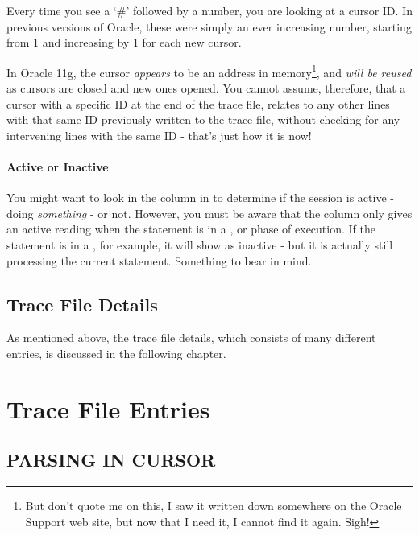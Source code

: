 Every time you see a `\#' followed by a number, you are looking at a cursor ID. In previous versions of Oracle, these were simply an ever increasing number, starting from 1 and increasing by 1 for each new cursor.

In Oracle 11g, the cursor \emph{appears} to be an address in memory\footnote{But don't quote me on this, I saw it written down somewhere on the Oracle Support web site, but now that I need it, I cannot find it again. Sigh!}, and \emph{will be reused} as cursors are closed and new ones opened. You cannot assume, therefore, that a cursor with a specific ID at the end of the trace file, relates to any other lines with that same ID previously written to the trace file, without checking for any intervening  lines with the same ID - that's just how it is now!

\subsubsection{Active or Inactive}\label{active-or-inactive}

You might want to look in the  column in  to determine if the session is active - doing \emph{something} - or not. However, you must be aware that the  column only gives an active reading when the statement is in a ,  or  phase of execution. If the statement is in a , for example, it will show as inactive - but it is actually still processing the current statement. Something to bear in mind.

\section{Trace File Details}\label{trace-file-details}

As mentioned above, the trace file details, which consists of many different entries, is discussed in the following chapter.

\chapter{Trace File Entries}

\section{PARSING IN CURSOR}\label{parsing-in-cursor}

